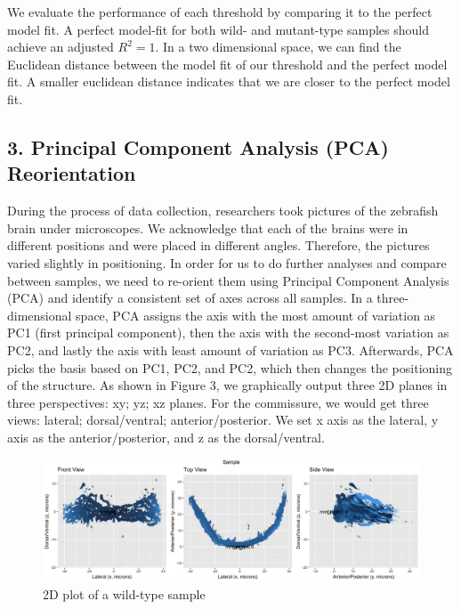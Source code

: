 \documentclass[10pt,letterpaper]{article}
\begin{document}
We evaluate the performance of each threshold by comparing it to the
perfect model fit. A perfect model-fit for both wild- and mutant-type
samples should achieve an adjusted \(R^2 = 1\). In a two dimensional
space, we can find the Euclidean distance between the model fit of our
threshold and the perfect model fit. A smaller euclidean distance
indicates that we are closer to the perfect model fit.

\hypertarget{principal-component-analysis-pca-reorientation}{%
\subsection{3. Principal Component Analysis (PCA)
Reorientation}\label{principal-component-analysis-pca-reorientation}}

During the process of data collection, researchers took pictures of the
zebrafish brain under microscopes. We acknowledge that each of the
brains were in different positions and were placed in different angles.
Therefore, the pictures varied slightly in positioning. In order for us
to do further analyses and compare between samples, we need to re-orient
them using Principal Component Analysis (PCA) and identify a consistent
set of axes across all samples. In a three-dimensional space, PCA
assigns the axis with the most amount of variation as PC1 (first
principal component), then the axis with the second-most variation as
PC2, and lastly the axis with least amount of variation as PC3.
Afterwards, PCA picks the basis based on PC1, PC2, and PC2, which then
changes the positioning of the structure. As shown in Figure 3, we
graphically output three 2D planes in three perspectives: xy; yz; xz
planes. For the commissure, we would get three views: lateral;
dorsal/ventral; anterior/posterior. We set x axis as the lateral, y axis
as the anterior/posterior, and z as the dorsal/ventral.

\begin{figure}[H]
\includegraphics[width=1\linewidth]{visualization_paper/wt_04} \caption{2D plot of a wild-type sample}\label{fig:Figure3}
\end{figure}
\end{document}
